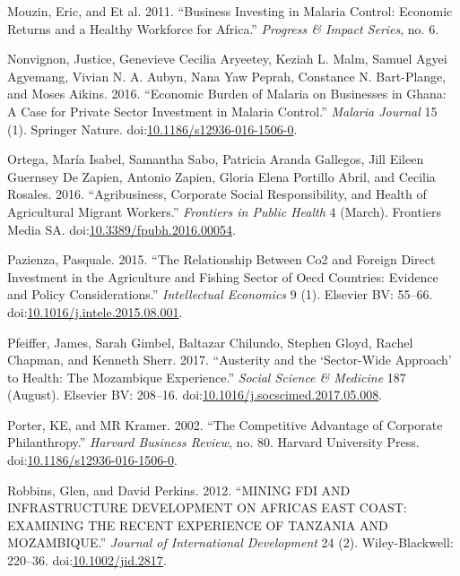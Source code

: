 \documentclass[]{article}
\begin{document}
\hypertarget{ref-Mouzin2011}{}
Mouzin, Eric, and Et al. 2011. ``Business Investing in Malaria Control:
Economic Returns and a Healthy Workforce for Africa.'' \emph{Progress \&
Impact Series}, no. 6.

\hypertarget{ref-Nonvignon_2016}{}
Nonvignon, Justice, Genevieve Cecilia Aryeetey, Keziah L. Malm, Samuel
Agyei Agyemang, Vivian N. A. Aubyn, Nana Yaw Peprah, Constance N.
Bart-Plange, and Moses Aikins. 2016. ``Economic Burden of Malaria on
Businesses in Ghana: A Case for Private Sector Investment in Malaria
Control.'' \emph{Malaria Journal} 15 (1). Springer Nature.
doi:\href{https://doi.org/10.1186/s12936-016-1506-0}{10.1186/s12936-016-1506-0}.

\hypertarget{ref-Ortega_2016}{}
Ortega, María Isabel, Samantha Sabo, Patricia Aranda Gallegos, Jill
Eileen Guernsey De Zapien, Antonio Zapien, Gloria Elena Portillo Abril,
and Cecilia Rosales. 2016. ``Agribusiness, Corporate Social
Responsibility, and Health of Agricultural Migrant Workers.''
\emph{Frontiers in Public Health} 4 (March). Frontiers Media SA.
doi:\href{https://doi.org/10.3389/fpubh.2016.00054}{10.3389/fpubh.2016.00054}.

\hypertarget{ref-Pazienza_2015}{}
Pazienza, Pasquale. 2015. ``The Relationship Between Co2 and Foreign
Direct Investment in the Agriculture and Fishing Sector of Oecd
Countries: Evidence and Policy Considerations.'' \emph{Intellectual
Economics} 9 (1). Elsevier BV: 55--66.
doi:\href{https://doi.org/10.1016/j.intele.2015.08.001}{10.1016/j.intele.2015.08.001}.

\hypertarget{ref-Pfeiffer_2017}{}
Pfeiffer, James, Sarah Gimbel, Baltazar Chilundo, Stephen Gloyd, Rachel
Chapman, and Kenneth Sherr. 2017. ``Austerity and the `Sector-Wide
Approach' to Health: The Mozambique Experience.'' \emph{Social Science
\& Medicine} 187 (August). Elsevier BV: 208--16.
doi:\href{https://doi.org/10.1016/j.socscimed.2017.05.008}{10.1016/j.socscimed.2017.05.008}.

\hypertarget{ref-Porter2002}{}
Porter, KE, and MR Kramer. 2002. ``The Competitive Advantage of
Corporate Philanthropy.'' \emph{Harvard Business Review}, no. 80.
Harvard University Press.
doi:\href{https://doi.org/10.1186/s12936-016-1506-0}{10.1186/s12936-016-1506-0}.

\hypertarget{ref-Robbins2012}{}
Robbins, Glen, and David Perkins. 2012. ``MINING FDI AND INFRASTRUCTURE
DEVELOPMENT ON AFRICAS EAST COAST: EXAMINING THE RECENT EXPERIENCE OF
TANZANIA AND MOZAMBIQUE.'' \emph{Journal of International Development}
24 (2). Wiley-Blackwell: 220--36.
doi:\href{https://doi.org/10.1002/jid.2817}{10.1002/jid.2817}.
\end{document}
